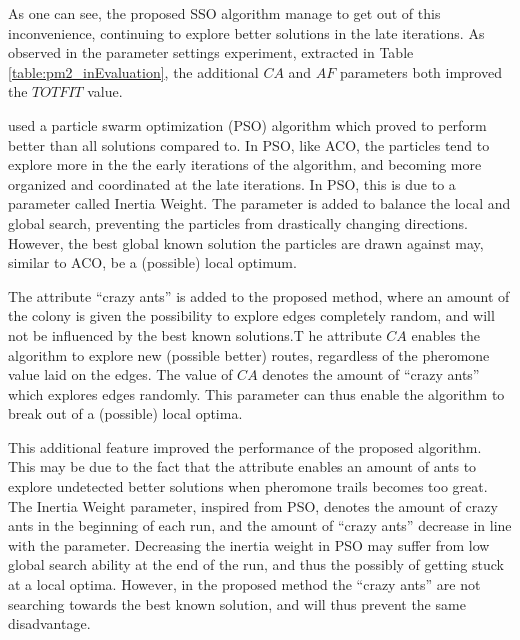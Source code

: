 As one can see, the proposed SSO algorithm manage to get out of this inconvenience, continuing to explore better solutions in the late iterations. As observed in the parameter settings experiment, extracted in Table \vref{table:pm2_inEvaluation}, the additional $CA$ and $AF$ parameters both improved the $TOTFIT$ value. %

\citet{kechagiopoulos14} used a particle swarm optimization (PSO) algorithm which proved to perform better than all solutions compared to. In PSO, like ACO, the particles tend to explore more in the the early iterations of the algorithm, and becoming more organized and coordinated at the late iterations. In PSO, this is due to a parameter called Inertia Weight. The parameter is added to balance the local and global search, preventing the particles from drastically changing directions. However, the best global known solution the particles are drawn against may, similar to ACO, be a (possible) local optimum. 

The attribute ``crazy ants'' is added to the proposed method, where an amount of the colony is given the possibility to explore edges completely random, and will not be influenced by the best known solutions.T he attribute $CA$ enables the algorithm to explore new (possible better) routes, regardless of the pheromone value laid on the edges. The value of $CA$ denotes the amount of ``crazy ants'' which explores edges randomly. This parameter can thus enable the algorithm to break out of a (possible) local optima. 

This additional feature improved the performance of the proposed algorithm. This may be due to the fact that the attribute enables an amount of ants to explore undetected better solutions when pheromone trails becomes too great. The Inertia Weight parameter, inspired from PSO, denotes the amount of crazy ants in the beginning of each run, and the amount of ``crazy ants'' decrease in line with the parameter. Decreasing the inertia weight in PSO may suffer from low global search ability at the end of the run, and thus the possibly of getting stuck at a local optima. However, in the proposed method the ``crazy ants'' are not searching towards the best known solution, and will thus prevent the same disadvantage. 


